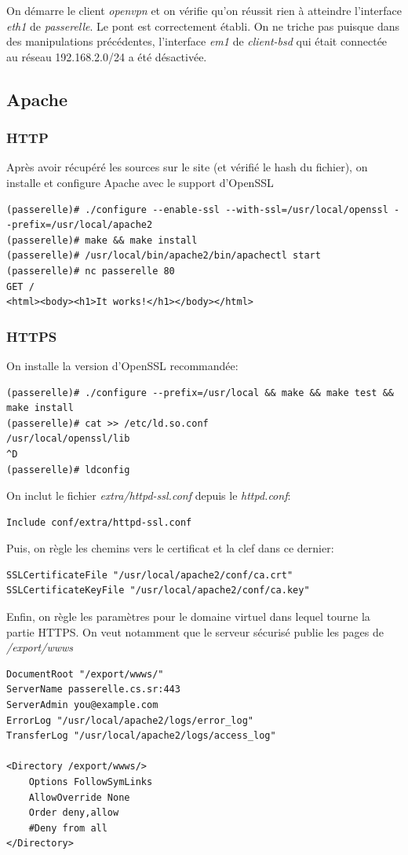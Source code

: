 \documentclass[a4paper]{article}
\begin{document}
On démarre le client \textit{openvpn} et on vérifie qu'on réussit rien à atteindre
l'interface \textit{eth1} de \textit{passerelle}. Le pont est correctement établi.
On ne triche pas puisque dans des manipulations précédentes, l'interface \textit{em1}
de \textit{client-bsd} qui était connectée au réseau 192.168.2.0/24 a été désactivée.

\subsection{Apache}
\subsubsection{HTTP}
Après avoir récupéré les sources sur le site (et vérifié le hash du fichier), on 
installe et configure
Apache avec le support d'OpenSSL
\begin{verbatim}
(passerelle)# ./configure --enable-ssl --with-ssl=/usr/local/openssl --prefix=/usr/local/apache2
(passerelle)# make && make install
(passerelle)# /usr/local/bin/apache2/bin/apachectl start
(passerelle)# nc passerelle 80
GET /
<html><body><h1>It works!</h1></body></html>
\end{verbatim}
\subsubsection{HTTPS}
On installe la version d'OpenSSL recommandée:
\begin{verbatim}
(passerelle)# ./configure --prefix=/usr/local && make && make test && make install
(passerelle)# cat >> /etc/ld.so.conf
/usr/local/openssl/lib
^D
(passerelle)# ldconfig
\end{verbatim}

On inclut le fichier \textit{extra/httpd-ssl.conf} depuis le
\textit{httpd.conf}:
\begin{verbatim}
Include conf/extra/httpd-ssl.conf
\end{verbatim}

Puis, on règle les chemins vers le certificat et la clef dans ce
dernier:
\begin{verbatim}
SSLCertificateFile "/usr/local/apache2/conf/ca.crt"
SSLCertificateKeyFile "/usr/local/apache2/conf/ca.key"
\end{verbatim}

Enfin, on règle les paramètres pour le domaine virtuel dans lequel
tourne la partie HTTPS. On veut notamment que le serveur sécurisé
publie les pages de \textit{/export/wwws}
\begin{verbatim}
DocumentRoot "/export/wwws/"
ServerName passerelle.cs.sr:443
ServerAdmin you@example.com
ErrorLog "/usr/local/apache2/logs/error_log"
TransferLog "/usr/local/apache2/logs/access_log"

<Directory /export/wwws/>
    Options FollowSymLinks
    AllowOverride None
    Order deny,allow
    #Deny from all
</Directory>
\end{verbatim}
\end{document}
